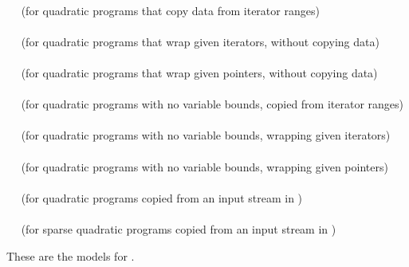 \\
$\quad$ (for quadratic programs that copy data from iterator ranges) \\
\\
$\quad$ (for quadratic programs that wrap given iterators, without copying 
data) \\
\\
$\quad$ (for quadratic programs that wrap given pointers, without copying 
data) \\
\\
$\quad$ (for quadratic programs with no variable bounds, copied from iterator ranges)\\
\\
$\quad$ (for quadratic programs with no variable bounds, wrapping given iterators)\\
\\
$\quad$ (for quadratic programs with no variable bounds, wrapping given pointers)\\
\\
$\quad$ (for quadratic programs copied from an input stream in 
)\\
\\
$\quad$ (for sparse quadratic programs copied from an input stream in 
)


These are the models for .

